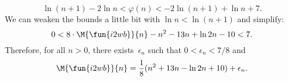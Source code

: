 \begin{equation*}
\ln(n+1) - 2\ln n < \varphi(n) < -2\ln(n+1) + \ln n + 7.
\end{equation*}
We can weaken the bounds a little bit with \(\ln n < \ln(n+1)\) and
simplify:
\begin{equation*}
0 < 8 \cdot \M{\fun{i2wb}}{n} - n^2 - 13n + \ln 2n - 10 < 7.
\end{equation*}
Therefore, for all \(n > 0\), there exists~\(\epsilon_n\) such that
\(0 < \epsilon_n < 7/8\) and
\begin{equation}
\M{\fun{i2wb}}{n}
  = \frac{1}{8}(n^2 + 13n - \ln 2n + 10) + \epsilon_n.
\label{eq:ave_i2wb}
\end{equation}
